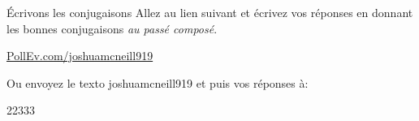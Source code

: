 \begin{frame}{Écrivons les conjugaisons}
  Allez au lien suivant et écrivez vos réponses en donnant les bonnes conjugaisons \emph{au passé composé}. \\
  \begin{center}
    \url{PollEv.com/joshuamcneill919}
  \end{center}
  Ou envoyez le texto \alert{joshuamcneill919} et puis vos réponses à: \\
  \begin{center}
    22333
  \end{center}
\end{frame}